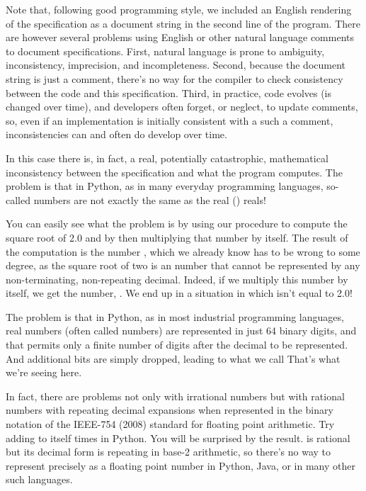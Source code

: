 \documentclass[letterpaper,10pt,english]{sphinxmanual}
\begin{document}
Note that, following good programming style, we included an English
rendering of the specification as a document string in the second line
of the program.  There are however several problems using English or
other natural language comments to document specifications. First,
natural language is prone to ambiguity, inconsistency, imprecision,
and incompleteness. Second, because the document string is just a
comment, there’s no way for the compiler to check consistency between
the code and this specification. Third, in practice, code evolves (is
changed over time), and developers often forget, or neglect, to update
comments, so, even if an implementation is initially consistent with a
such a comment, inconsistencies can and often do develop over time.

In this case there is, in fact, a real, potentially catastrophic,
mathematical inconsistency between the specification and what the
program computes. The problem is that in Python, as in many everyday
programming languages, so-called  numbers are not exactly the
same as the real () reals!

You can easily see what the problem is by using our procedure to
compute the square root of 2.0 and by then multiplying that number by
itself. The result of the computation is the number ,
which we already know has to be wrong to some degree, as the square
root of two is an  number that cannot be represented by
any non-terminating, non-repeating decimal. Indeed, if we multiply
this number by itself, we get the number, . We end up
in a situation in which  isn’t equal to 2.0!

The problem is that in Python, as in most industrial programming
languages,  real numbers (often called 
numbers) are represented in just 64 binary digits, and that permits
only a finite number of digits after the decimal to be represented.
And additional  bits are simply dropped, leading to what
we call  That’s what we’re seeing
here.

In fact, there are problems not only with irrational numbers but with
rational numbers with repeating decimal expansions when represented in
the binary notation of the IEEE-754 (2008) standard for floating point
arithmetic. Try adding  to itself  times in Python. You will
be surprised by the result.  is rational but its decimal form is
repeating in base-2 arithmetic, so there’s no way to represent 
precisely as a floating point number in Python, Java, or in many other
such languages.
\end{document}
